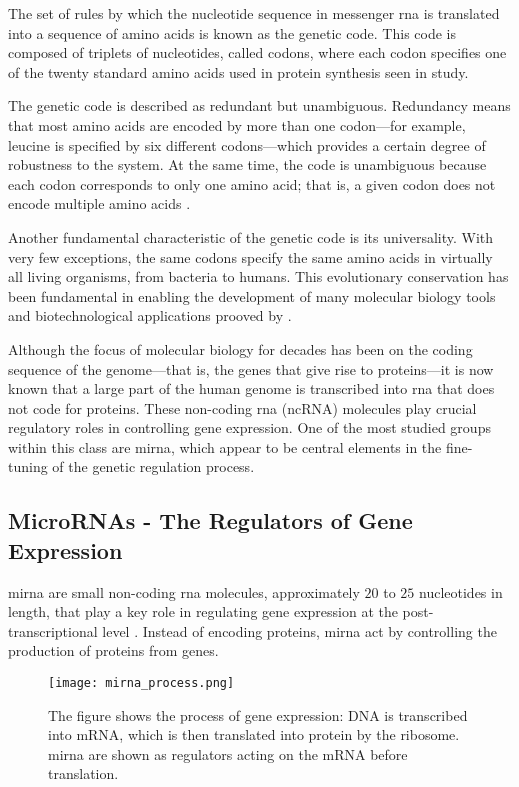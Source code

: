 The set of rules by which the nucleotide sequence in messenger \gls{rna} is
translated into a sequence of amino acids is known as the genetic code. This
code is composed of triplets of nucleotides, called codons, where each codon
specifies one of the twenty standard amino acids used in protein synthesis seen
in \textcite{genetic_codeNovozhilov2008O} study.

The genetic code is described as redundant but unambiguous. Redundancy means
that most amino acids are encoded by more than one codon—for example, leucine
is specified by six different codons—which provides a certain degree of
robustness to the system. At the same time, the code is unambiguous because
each codon corresponds to only one amino acid; that is, a given codon does not
encode multiple amino acids \cite{ConceptsBiology_DNA}.

Another fundamental characteristic of the genetic code is its universality.
With very few exceptions, the same codons specify the same amino acids in
virtually all living organisms, from bacteria to humans. This evolutionary
conservation has been fundamental in enabling the development of many molecular
biology tools and biotechnological applications prooved by
\textcite{genetic_codeKoonin2017}.

Although the focus of molecular biology for decades has been on the coding
sequence of the genome—that is, the genes that give rise to proteins—it is now
known that a large part of the human genome is transcribed into \gls{rna} that
does not code for proteins. These non-coding \gls{rna} (ncRNA) molecules play
crucial regulatory roles in controlling gene expression. One of the most
studied groups within this class are \gls{mirna}, which appear to be central
elements in the fine-tuning of the genetic regulation process.

\subsection{MicroRNAs - The Regulators of Gene Expression}
\gls{mirna} are small non-coding \gls{rna} molecules, approximately $20$
to $25$ nucleotides in length, that play a key role in regulating gene
expression at the post-transcriptional level
\cite{regulatory_mecha_mirnaGulyaeva2016,
  first_mirna_Ambros1993,post_transcript_wightman1993}. Instead of encoding
proteins, \gls{mirna} act by controlling the production of proteins from genes.

\begin{figure}[h]
  \centering
  \texttt{[image: mirna\_process.png]}
  \caption{The figure shows the process of gene expression: DNA is transcribed
    into mRNA, which is then translated into protein by the ribosome. \gls{mirna}
    are shown as regulators acting on the mRNA before translation.}
  \label{fig:mirna_mechanism}
\end{figure}

